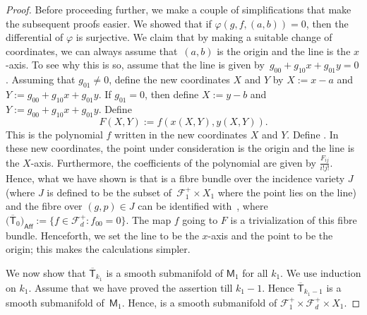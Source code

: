 \begin{proof}
Before proceeding further, we make a couple of simplifications that make the
subsequent proofs easier.
We showed that if $\varphi(g, f, (a, b)) = 0$, then the
differential of $\varphi$ is surjective. We claim that by making a suitable change of
coordinates, we can always assume that~$(a,b)$ is the origin and the line is the $x$-axis.
To see why this is so,
assume that the line is given by~${g_{00} + g_{10}x + g_{01}y = 0}$.
Assuming that $g_{01}\neq 0$, define the new coordinates $X$
and $Y$ by $X := x-a$ and $Y := g_{00} + g_{10}x + g_{01}y$.
If $g_{01} =0$, then define $X:= y-b$ and $Y:= g_{00} + g_{10}x + g_{01}y$.
Define
\[F(X,Y):= f(x(X,Y), y(X,Y)).\]
This is the polynomial $f$
written in the new coordinates $X$ and $Y$. Define
.
In these new coordinates, the point under consideration is the origin
and the line is the $X$-axis. Furthermore, the coefficients of the polynomial
are given by $\frac{F_{ij}}{i!j!}$.
Hence, what we have shown is that
 is a fibre bundle over the incidence variety
$J$ (where $J$ is defined to be the subset of~${\mathcal{F}_1^{+}\times X_1}$ where the point lies on the line)
and the fibre over $(g, p) \in J$ can be identified with~, where
$\big(\overline{\mathsf{T}}_0\big)_{\mathsf{Aff}} := \{ f \in \mathcal{F}_d^+\colon f_{00}=0 \}$.
The map $f$ going to $F$ is a trivialization of this fibre bundle.
Henceforth, we set the line to be the $x$-axis and the point to be the origin; this makes the
calculations simpler.

We now show that $\overline{\mathsf{T}}_{k_1}$ is a smooth
submanifold of $\mathsf{M}_1$ for all $k_1$. We use induction on $k_1$.
Assume that we have proved the assertion till $k_1-1$. Hence
$\overline{\mathsf{T}}_{k_1-1}$ is a smooth
submanifold of~$\mathsf{M}_1$. Hence,
 is a smooth submanifold of
$\mathcal{F}_1^{+} \times \mathcal{F}_d^{+} \times X_1$.


\end{proof}
